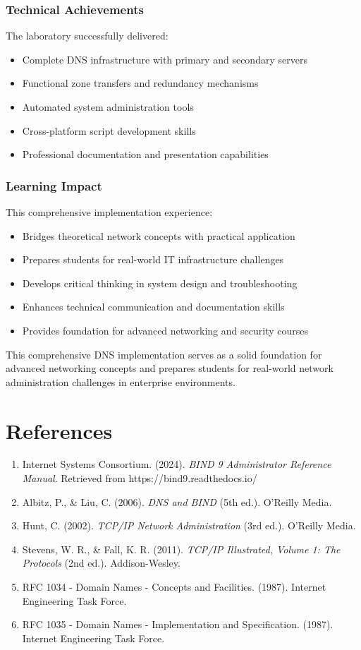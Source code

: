 \documentclass[12pt,a4paper]{article}
\begin{document}
\subsubsection{Technical Achievements}
The laboratory successfully delivered:
\begin{itemize}
    \item Complete DNS infrastructure with primary and secondary servers
    \item Functional zone transfers and redundancy mechanisms
    \item Automated system administration tools
    \item Cross-platform script development skills
    \item Professional documentation and presentation capabilities
\end{itemize}

\subsubsection{Learning Impact}
This comprehensive implementation experience:
\begin{itemize}
    \item Bridges theoretical network concepts with practical application
    \item Prepares students for real-world IT infrastructure challenges
    \item Develops critical thinking in system design and troubleshooting
    \item Enhances technical communication and documentation skills
    \item Provides foundation for advanced networking and security courses
\end{itemize}

This comprehensive DNS implementation serves as a solid foundation for advanced networking concepts and prepares students for real-world network administration challenges in enterprise environments.

\newpage

\section{References}\label{sec:references}

\begin{enumerate}
    \item Internet Systems Consortium. (2024). \textit{BIND 9 Administrator Reference Manual}. Retrieved from https://bind9.readthedocs.io/
    \item Albitz, P., \& Liu, C. (2006). \textit{DNS and BIND} (5th ed.). O'Reilly Media.
    \item Hunt, C. (2002). \textit{TCP/IP Network Administration} (3rd ed.). O'Reilly Media.
    \item Stevens, W. R., \& Fall, K. R. (2011). \textit{TCP/IP Illustrated, Volume 1: The Protocols} (2nd ed.). Addison-Wesley.
    \item RFC 1034 - Domain Names - Concepts and Facilities. (1987). Internet Engineering Task Force.
    \item RFC 1035 - Domain Names - Implementation and Specification. (1987). Internet Engineering Task Force.
\end{enumerate}
\end{document}
